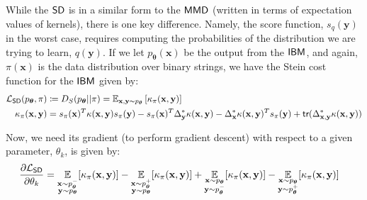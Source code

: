 While the $\operatorname{\textsf{SD}}$ is in a similar form to the $\operatorname{\textsf{MMD}}$ (written in terms of expectation values of kernels), there is one key difference. Namely, the score function, $s_q(\mathbf{y})$ in the worst case, requires computing the probabilities of the distribution we are trying to learn, $q(\mathbf{y})$. If we let $p_{\boldsymbol\theta}(\mathbf{x})$ be the output from the $\textsf{IBM}$, and again, $\pi(\mathbf{x})$ is the data distribution over binary strings, we have the Stein cost function for the $\textsf{IBM}$ given by:
\begin{align}
    \mathcal{L}_{\operatorname{\textsf{SD}}}(p_{\boldsymbol\theta}, \pi) &  \coloneqq D_S(p_{\boldsymbol\theta}||\pi)  = \mathbb{E}_{\mathbf{x}, \mathbf{y}\sim p_{\boldsymbol\theta}}\left[\kappa_\pi(\mathbf{x}, \mathbf{y})\right]\label{steindiscrepancybornmachine_supp}\\
    \kappa_\pi(\mathbf{x}, \mathbf{y}) &= s_\pi(\mathbf{x})^T\kappa(\mathbf{x}, \mathbf{y})s_\pi(\mathbf{y}) -s_\pi(\mathbf{x})^T\Delta_{\mathbf{y}}^*\kappa(\mathbf{x}, \mathbf{y})  - \Delta_{\mathbf{x}}^*\kappa(\mathbf{x}, \mathbf{y})^Ts_\pi(\mathbf{y}) + \textsf{tr}(\Delta_{\mathbf{x}, \mathbf{y}}^*\kappa(\mathbf{x}, \mathbf{y})) \label{weightedkernelbornmachine_supp}
\end{align}

\noindent Now, we need its gradient (to perform gradient descent) with respect to a given parameter, $\theta_k$, is given by:
\begin{align}
    \frac{\partial \mathcal{L}_{\operatorname{\textsf{SD}}}}{\partial \theta_k} &= \underset{\substack{\mathbf{x} \sim p^-_{\boldsymbol\theta} \\ \mathbf{y}\sim p_{\boldsymbol\theta}}}{\mathbb{E}}[\kappa_\pi(\mathbf{x}, \mathbf{y})] - \underset{\substack{\mathbf{x} \sim p^+_{\boldsymbol\theta} \\ \mathbf{y}\sim p_{\boldsymbol\theta}}}{\mathbb{E}}[\kappa_\pi(\mathbf{x}, \mathbf{y})] +\underset{\substack{\mathbf{x} \sim p_{\boldsymbol\theta}\\ \mathbf{y}\sim p^-_{\boldsymbol\theta}}}{\mathbb{E}}[\kappa_\pi(\mathbf{x}, \mathbf{y})] - \underset{\substack{\mathbf{x} \sim p_{\boldsymbol\theta} \\ \mathbf{y}\sim p^+_{\boldsymbol\theta}}}{\mathbb{E}}[\kappa_\pi(\mathbf{x}, \mathbf{y})] \label{steingradient_supp}
\end{align}


